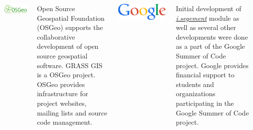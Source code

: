 \documentclass[25pt, margin=0mm, innermargin=15mm, blockverticalspace=15mm, colspace=15mm, subcolspace=8mm]{tikzposter}
\newcommand{\gmodule}[1]{\href{http://grass.osgeo.org/grass72/manuals/#1.html}{\emph{#1}}}
\begin{document}
\begin{columns}
{\newcommand{\listhspace}{\hspace{0.005\linewidth}}
\newcommand{\listlogowidth}{0.10\linewidth}
\newcommand{\listtextwidth}{0.82\linewidth}

\begin{minipage}{\listlogowidth}
\includegraphics[width=\linewidth]{osgeo}
\end{minipage}
\listhspace
\begin{minipage}{\listtextwidth}
Open Source Geospatial Foundation (OSGeo)
supports the collaborative development of open source geospatial software.
GRASS GIS is a OSGeo project.
OSGeo provides infrastructure for project
websites, mailing lists and source code management.
\end{minipage}

\bigskip

\begin{minipage}{\listlogowidth}
\includegraphics[width=\linewidth]{google}
\end{minipage}
\listhspace
\begin{minipage}{\listtextwidth}
Initial development of \gmodule{i.segement} module as well as several other developments
were done as a part of the Google Summer of Code project.
Google provides financial support to students and organizations participating in the Google Summer of Code project.
\end{minipage}

\bigskip

\vspace{0.2cm}

}
\end{columns}
\end{document}
